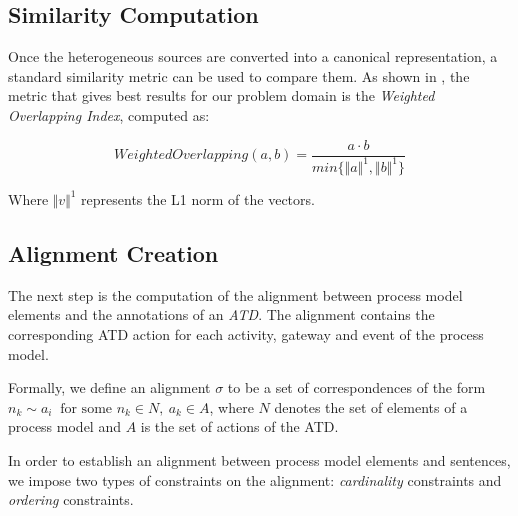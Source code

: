\subsection{Similarity Computation}

Once the heterogeneous sources are converted into a canonical representation, a
standard similarity metric can be used to compare them. As shown in
\cite{10.1007/978-3-319-59536-8_26}, the metric that gives best results for our
problem domain is the \emph{Weighted Overlapping Index}, computed as:

\begin{equation}
  WeightedOverlapping(a, b) = \frac{a \cdot b}{min\{\Vert a \Vert^1, \Vert b \Vert^1\}}
\end{equation}

Where $\Vert v \Vert^1$ represents the L1 norm of the vectors.

\subsection{Alignment Creation}
\label{sec:alignment_creation}

The next step is the computation of the alignment between process model elements
and the annotations of an \emph{ATD}. The alignment contains the
corresponding ATD action for each activity, gateway and event of the process model.

\newcommand{\corresp}[2]{#1 \sim #2}
\newcommand{\ncorresp}[2]{#1 \nsim #2}

Formally, we define an alignment $\sigma$ to be a set of correspondences of the
form $\corresp{n_k}{a_i} ~ \text{ for some } n_k \in N, ~ a_k \in A$, where $N$
denotes the set of elements of a process model and  $A$ is the set of actions
of the ATD. 

In order to establish an alignment between process model elements and sentences,
we impose two types of constraints on the alignment:  \textit{cardinality}
constraints and \textit{ordering} constraints.

